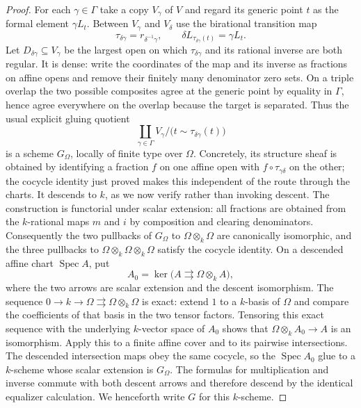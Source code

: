 \documentclass[11pt,oneside]{article}
\theoremstyle{definition}
\theoremstyle{remark}
\begin{document}
\begin{proof}
For each $\gamma\in\Gamma$ take a copy $V_\gamma$ of $V$ and regard its generic point
$t$ as the formal element $\gamma L_t$.  Between $V_\gamma$ and $V_\delta$ use the
birational transition map
\[
 \tau_{\delta\gamma}=r_{\delta^{-1}\gamma},\qquad
 \delta L_{\tau_{\delta\gamma}(t)}=\gamma L_t.                \tag{8.2c}
\]
Let $D_{\delta\gamma}\subseteq V_\gamma$ be the largest open on which
$\tau_{\delta\gamma}$ and its rational inverse are both regular.  It is dense: write the
coordinates of the map and its inverse as fractions on affine opens and remove their
finitely many denominator zero sets.  On a triple overlap the two possible composites
agree at the generic point by equality in $\Gamma$, hence agree everywhere on the
overlap because the target is separated.  Thus the usual explicit gluing quotient
\[
 \coprod_{\gamma\in\Gamma}V_\gamma\big/
 \bigl(t\sim\tau_{\delta\gamma}(t)\bigr)                       \tag{8.2d}
\]
is a scheme $G_\Omega$, locally of finite type over $\Omega$.  Concretely, its structure sheaf is
obtained by identifying a fraction $f$ on one affine open with
$f\circ\tau_{\gamma\delta}$ on the other; the cocycle identity just proved makes this
independent of the route through the charts.  It descends to $k$, as we now verify rather
than invoking descent.  The construction is functorial under scalar extension: all
fractions are obtained from the $k$-rational maps $m$ and $i$ by composition and
clearing denominators.  Consequently the two pullbacks of $G_\Omega$ to
$\Omega\otimes_k\Omega$ are canonically isomorphic, and the three pullbacks to
$\Omega\otimes_k\Omega\otimes_k\Omega$ satisfy the cocycle identity.  On a descended
affine chart $\operatorname{Spec}A$, put
\[
 A_0=\ker\bigl(A\rightrightarrows \Omega\otimes_k A\bigr),
\]
where the two arrows are scalar extension and the descent isomorphism.  The sequence
$0\to k\to\Omega\rightrightarrows\Omega\otimes_k\Omega$ is exact: extend $1$ to a
$k$-basis of $\Omega$ and compare the coefficients of that basis in the two tensor
factors.  Tensoring this exact sequence with the underlying $k$-vector space of $A_0$
shows that $\Omega\otimes_kA_0\to A$ is an isomorphism.  Apply this to a finite affine
cover and to its pairwise intersections.  The descended intersection maps obey the same
cocycle, so the $\operatorname{Spec}A_0$ glue to a $k$-scheme whose scalar extension is
$G_\Omega$.  The formulas for multiplication and inverse commute with both descent
arrows and therefore descend by the identical equalizer calculation.  We henceforth
write $G$ for this $k$-scheme.


\end{proof}
\end{document}
